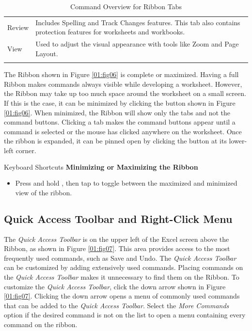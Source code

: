 \begin{table}[H]
{\begin{longtable}{L{0.75in}L{3.50in}}
			Review & Includes Spelling and Track Changes features. This tab also contains protection features for worksheets and workbooks.\\
			
			View & Used to adjust the visual appearance with tools like Zoom and Page Layout.\\

			\caption{Command Overview for Ribbon Tabs}
			\label{01:tab01}
		\end{longtable}
	} %
\end{table}

The Ribbon shown in Figure \ref{01:fig06} is complete or maximized. Having a full Ribbon makes commands always visible while developing a worksheet. However, the Ribbon may take up too much space around the worksheet on a small screen. If this is the case, it can be minimized by clicking the button shown in Figure \ref{01:fig06}. When minimized, the Ribbon will show only the tabs and not the command buttons. Clicking a tab makes the command buttons appear until a command is selected or the mouse has clicked anywhere on the worksheet. Once the ribbon is expanded, it can be pinned open by clicking the  button at its lower-left corner.

\begin{center}
	\begin{shtcutbox}{Keyboard Shortcuts}
		\textbf{Minimizing or Maximizing the Ribbon}
		\\
		\begin{itemize}
			\setlength{\itemsep}{0pt}
			\setlength{\parskip}{0pt}
			\setlength{\parsep}{0pt}
			
			\item Press and hold , then tap  to toggle between the maximized and minimized view of the ribbon.
			
		\end{itemize}
	\end{shtcutbox}
\end{center}

\subsection{Quick Access Toolbar and Right-Click Menu}

The \textit{Quick Access Toolbar} is on the upper left of the Excel screen above the Ribbon, as shown in Figure \ref{01:fig07}. This area provides access to the most frequently used commands, such as Save and Undo. The \textit{Quick Access Toolbar} can be customized by adding extensively used commands. Placing commands on the \textit{Quick Access Toolbar} makes it unnecessary to find them on the Ribbon. To customize the \textit{Quick Access Toolbar}, click the down arrow shown in Figure \ref{01:fig07}. Clicking the down arrow opens a menu of commonly used commands that can be added to the \textit{Quick Access Toolbar}. Select the \textit{More Commands} option if the desired command is not on the list to open a menu containing every command on the ribbon.

